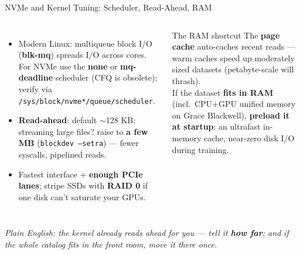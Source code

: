 \documentclass[aspectratio=169]{beamer}
\newcommand{\kw}[1]{\textbf{\textcolor{kwblue}{#1}}}
\newcommand{\pe}[1]{\par{\setlength{\fboxsep}{2.5pt}\noindent\colorbox{navy!9}{\parbox{\dimexpr\textwidth-5pt\relax}{\footnotesize\itshape Plain English: #1}}}}
\begin{document}
\begin{frame}{NVMe and Kernel Tuning: Scheduler, Read-Ahead, RAM}
  \begin{columns}[t]
    \begin{itemize}\small
      \item Modern Linux: multiqueue block I/O (\kw{blk-mq}) spreads I/O across cores.
            For NVMe use the \kw{none} or \kw{mq-deadline} scheduler (CFQ is obsolete);
            verify via \texttt{/sys/block/nvme*/queue/scheduler}.
      \item \kw{Read-ahead}: default $\sim$128 KB; streaming large files? raise to
            \kw{a few MB} (\texttt{blockdev --setra}) --- fewer syscalls, pipelined reads.
      \item Fastest interface + \kw{enough PCIe lanes}; stripe SSDs with \kw{RAID 0} if one
            disk can't saturate your GPUs.
    \end{itemize}
    \begin{block}{The RAM shortcut}
      \small The \kw{page cache} auto-caches recent reads --- warm caches speed up
      moderately sized datasets (petabyte-scale will thrash).\\[3pt]
      If the dataset \kw{fits in RAM} (incl.\ CPU+GPU unified memory on Grace Blackwell),
      \kw{preload it at startup}: an ultrafast in-memory cache, near-zero disk I/O
      during training.
    \end{block}
  \end{columns}
  \pe{the kernel already reads ahead for you --- tell it \kw{how far}; and if the whole catalog fits in the front room, move it there once.}
\end{frame}
\end{document}
